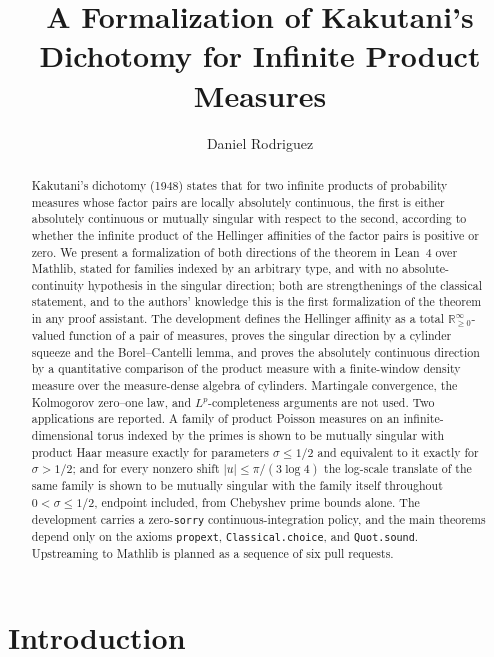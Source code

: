 \documentclass[a4paper,UKenglish,autoref,thm-restate]{lipics-v2021}
\title{A Formalization of Kakutani's Dichotomy for Infinite Product Measures}
\author{Daniel Rodriguez}{Independent researcher}{sadasant@gmail.com}{}{}
\newcommand{\ennreal}{\ensuremath{\mathbb{R}_{\ge 0}^{\infty}}}
\begin{document}
\maketitle

\begin{abstract}
Kakutani's dichotomy (1948) states that for two infinite products of
probability measures whose factor pairs are locally absolutely continuous, the
first is either absolutely continuous or mutually singular with respect to the
second, according to whether the infinite product of the Hellinger affinities
of the factor pairs is positive or zero. We present a formalization of both
directions of the theorem in Lean~4 over Mathlib, stated for families indexed
by an arbitrary type, and with no absolute-continuity hypothesis in the
singular direction; both are strengthenings of the classical statement, and to
the authors' knowledge this is the first formalization of the theorem in any
proof assistant. The development defines the Hellinger affinity as a total
\ennreal-valued function of a pair of measures, proves the singular direction
by a cylinder squeeze and the Borel--Cantelli lemma, and proves the absolutely
continuous direction by a quantitative comparison of the product measure with
a finite-window density measure over the measure-dense algebra of cylinders.
Martingale convergence, the Kolmogorov zero--one law, and $L^p$-completeness
arguments are not used. Two applications are reported. A family of product
Poisson measures on an infinite-dimensional torus indexed by the primes is
shown to be mutually singular with product Haar measure exactly for parameters
$\sigma \le 1/2$ and equivalent to it exactly for $\sigma > 1/2$; and for
every nonzero shift $|u| \le \pi/(3\log 4)$ the log-scale translate of the
same family is shown to be mutually singular with the family itself
throughout $0 < \sigma \le 1/2$, endpoint included, from Chebyshev prime
bounds alone. The development carries a zero-\texttt{sorry}
continuous-integration policy, and the main theorems depend only on the axioms
\texttt{propext}, \texttt{Classical.choice}, and \texttt{Quot.sound}.
Upstreaming to Mathlib is planned as a sequence of six pull requests.
\end{abstract}

\section{Introduction}
\label{sec:intro}
\end{document}
